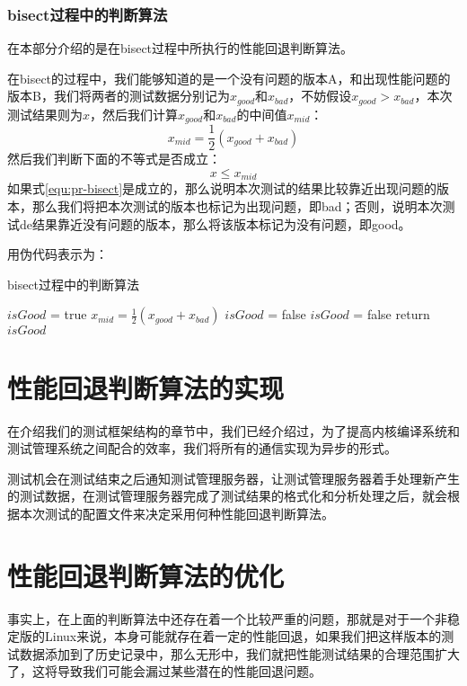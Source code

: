 \subsubsection{bisect过程中的判断算法}
在本部分介绍的是在bisect过程中所执行的性能回退判断算法。

在bisect的过程中，我们能够知道的是一个没有问题的版本A，和出现性能问题的版本B，我们将两者的测试数据分别记为$x_{good}$和$x_{bad}$，不妨假设$x_{good} > x_{bad}$，本次测试结果则为$x$，然后我们计算$x_{good}$和$x_{bad}$的中间值$x_{mid}$：
\begin{equation}
\label{equ:pr-mid}
x_{mid} = \frac{1}{2} (x_{good} + x_{bad})
\end{equation}
然后我们判断下面的不等式是否成立：
\begin{equation}
\label{equ:pr-bisect}
x \leq x_{mid}
\end{equation}
如果式\ref{equ:pr-bisect}是成立的，那么说明本次测试的结果比较靠近出现问题的版本，那么我们将把本次测试的版本也标记为出现问题，即bad；否则，说明本次测试de结果靠近没有问题的版本，那么将该版本标记为没有问题，即good。

用伪代码表示为：

\begin{algorithm}
\caption{bisect过程中的判断算法}
$isGood$ = true\;
$x_{mid} = \frac{1}{2}(x_{good} + x_{bad})$\;
{
	{
		$isGood$ = false\;
	}
}
\Else
{
	{
		$isGood$ = false\;
	}
}
return $isGood$\;
\end{algorithm}

\section{性能回退判断算法的实现}
在介绍我们的测试框架结构的章节中，我们已经介绍过，为了提高内核编译系统和测试管理系统之间配合的效率，我们将所有的通信实现为异步的形式。

测试机会在测试结束之后通知测试管理服务器，让测试管理服务器着手处理新产生的测试数据，在测试管理服务器完成了测试结果的格式化和分析处理之后，就会根据本次测试的配置文件来决定采用何种性能回退判断算法。

\section{性能回退判断算法的优化}
事实上，在上面的判断算法中还存在着一个比较严重的问题，那就是对于一个非稳定版的Linux来说，本身可能就存在着一定的性能回退，如果我们把这样版本的测试数据添加到了历史记录中，那么无形中，我们就把性能测试结果的合理范围扩大了，这将导致我们可能会漏过某些潜在的性能回退问题。


